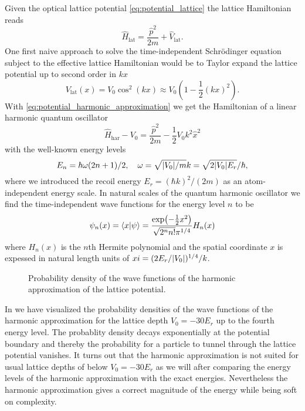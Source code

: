 Given the optical lattice potential \cref{eq:potential_lattice} the
lattice Hamiltonian reads
\begin{equation}
  \hat{H}_\text{lat}
  =\frac{\hat{p}^2}{2m}+\hat{V}_\text{lat}
  \label{eq:hamiltonian_lattice}.
\end{equation}
One first naive approach to solve the time-independent Schrödinger equation
subject to the effective lattice Hamiltonian would be to Taylor expand
the lattice potential up to second order in $kx$
\begin{equation}
  V_\text{lat}(x)
  =V_0\cos^2(kx)
  \approx V_0\left(1-\frac{1}{2}(kx)^2\right)
  \label{eq:potential_harmonic_approximation}.
\end{equation}
With \cref{eq:potential_harmonic_approximation} we get the Hamiltonian of a
linear harmonic quantum oscillator
\begin{equation}
  \hat{H}_\text{har}-V_0
  =\frac{\hat{p}^2}{2m}-\frac{1}{2}V_0k^2\hat{x}^2
  \label{eq:hamiltonian_harmonic_approximation}
\end{equation}
with the well-known energy levels
\begin{equation}
  E_n=\hbar\omega(2n+1)/2
  \qc
  \omega=\sqrt{\abs{V_0}/m}k=\sqrt{2\abs{V_0}E_r}/\hbar,
  \label{eq:energy_harmonic_approximation}
\end{equation}
where we introduced the recoil energy $E_r=(\hbar k)^2/(2m)$ as an
atom-independent energy scale. In natural scales of the quantum harmonic
oscillator we find the time-independent wave functions for the energy level
$n$ to be
\begin{equation}
  \psi_n(x)
  =
  \bra{x}\ket{\psi}
  =
  \frac{\exp(-\frac{1}{2}x^2)}{\sqrt{2^nn!}\pi^{1/4}}H_n(x)
  \label{eq:wavefunction_harmonic}
\end{equation}
where $H_n(x)$ is the $n$th Hermite polynomial and the spatial coordinate $x$
is expessed in natural length units of $xi=(2E_r/\abs{V_0})^{1/4}/k$.
\begin{figure}[htb]
  \centering
  \begin{adjustbox}{width=\textwidth}
    
  \end{adjustbox}
  \caption{Probability density of the wave functions of the harmonic
    approximation of the lattice potential.
  }\label{fig:scale_harmonic}
\end{figure}
In  we have visualized the probability densities of
the wave functions of the harmonic approximation for the lattice depth
$V_0=-30E_r$ up to the fourth energy level. The probablity density decays
exponentially at the potential boundary and thereby the probability for a
particle to tunnel through the lattice potential vanishes. It turns out that
the harmonic approximation is not suited for usual lattice depths of below
$V_0=-30E_r$ as we will after comparing the energy levels of the harmonic
approximation with the exact energies. Nevertheless the harmonic approximation
gives a correct magnitude of the energy while being soft on complexity.

